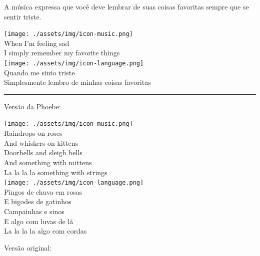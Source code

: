 A música expressa que você deve lembrar de suas coisas favoritas sempre
que se sentir triste.

\bigskip
\begin{tcolorbox}[enhanced,
    drop fuzzy shadow southeast, boxrule=0.3pt,
    lower separated=false, sidebyside, sidebyside align=top,
    halign=flush right, halign lower=left,
    colframe=black!30!dialogoBorder,colback=musicaBg]
\texttt{[image: ./assets/img/icon-music.png]}\\
When I’m feeling sad\\I simply remember my favorite things\\
\tcblower
\texttt{[image: ./assets/img/icon-language.png]}\\
Quando me sinto triste\\Simplesmente lembro de minhas coisas favoritas\\
\end{tcolorbox}

\begin{center}\rule{0.5\linewidth}{0.5pt}\end{center}

Versão da Phoebe:

\bigskip
\begin{tcolorbox}[enhanced,
    drop fuzzy shadow southeast, boxrule=0.3pt,
    lower separated=false, sidebyside, sidebyside align=top,
    halign=flush right, halign lower=left,
    colframe=black!30!dialogoBorder,colback=musicaBg]
\texttt{[image: ./assets/img/icon-music.png]}\\
Raindrops on roses\\And whiskers on kittens\\Doorbells and sleigh bells\\And something with mittens\\La la la la something with strings\\
\tcblower
\texttt{[image: ./assets/img/icon-language.png]}\\
Pingos de chuva em rosas\\E bigodes de gatinhos\\Campainhas e sinos\\E algo com luvas de lã\\La la la la algo com cordas\\
\end{tcolorbox}

Versão original:

